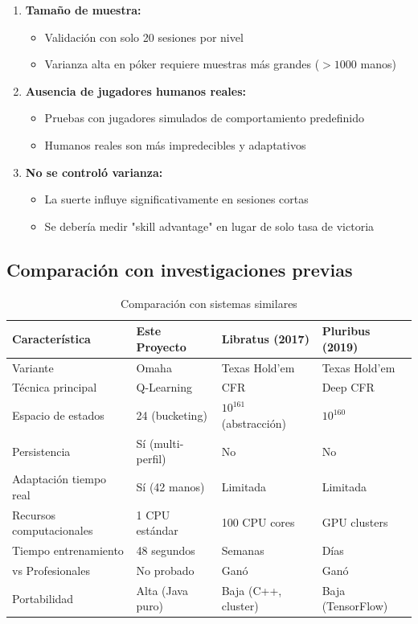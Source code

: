 \documentclass[12pt,a4paper]{article}
\begin{document}
\begin{enumerate}
    \item \textbf{Tamaño de muestra:}
    \begin{itemize}
        \item Validación con solo 20 sesiones por nivel
        \item Varianza alta en póker requiere muestras más grandes ($>1000$ manos)
    \end{itemize}
    
    \item \textbf{Ausencia de jugadores humanos reales:}
    \begin{itemize}
        \item Pruebas con jugadores simulados de comportamiento predefinido
        \item Humanos reales son más impredecibles y adaptativos
    \end{itemize}
    
    \item \textbf{No se controló varianza:}
    \begin{itemize}
        \item La suerte influye significativamente en sesiones cortas
        \item Se debería medir "skill advantage" en lugar de solo tasa de victoria
    \end{itemize}
\end{enumerate}

\subsection{Comparación con investigaciones previas}

\begin{table}[H]
\centering
\caption{Comparación con sistemas similares}
\small
\begin{tabular}{|p{2.5cm}|p{3cm}|p{3cm}|p{3cm}|}
\hline
\textbf{Característica} & \textbf{Este Proyecto} & \textbf{Libratus (2017)} & \textbf{Pluribus (2019)} \\
\hline
Variante & Omaha & Texas Hold'em & Texas Hold'em \\
\hline
Técnica principal & Q-Learning & CFR & Deep CFR \\
\hline
Espacio de estados & 24 (bucketing) & $10^{161}$ (abstracción) & $10^{160}$ \\
\hline
Persistencia & Sí (multi-perfil) & No & No \\
\hline
Adaptación tiempo real & Sí (42 manos) & Limitada & Limitada \\
\hline
Recursos computacionales & 1 CPU estándar & 100 CPU cores & GPU clusters \\
\hline
Tiempo entrenamiento & 48 segundos & Semanas & Días \\
\hline
vs Profesionales & No probado & Ganó & Ganó \\
\hline
Portabilidad & Alta (Java puro) & Baja (C++, cluster) & Baja (TensorFlow) \\
\hline
\end{tabular}
\label{tab:comparacion_sistemas}
\end{table}
\end{document}
